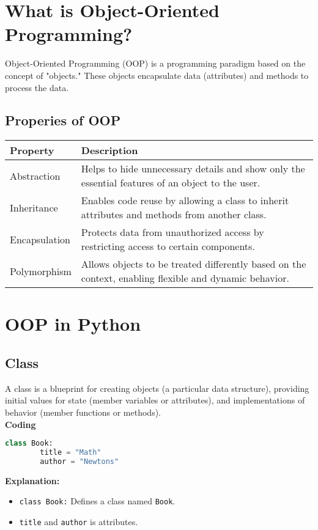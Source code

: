 \section{What is Object-Oriented Programming?}

Object-Oriented Programming (OOP) is a programming paradigm based on the concept of "objects." These objects encapsulate data (attributes) and methods to process the data.


\subsection{Properies of OOP}
\begin{table}[!h]
	\centering
	\begin{tabular}{|p{3cm}|p{9cm}|}
		\hline
		\textbf{Property} & \textbf{Description} \\ \hline
		Abstraction & Helps to hide unnecessary details and show only the essential features of an object to the user. \\ \hline
		Inheritance & Enables code reuse by allowing a class to inherit attributes and methods from another class. \\ \hline
		Encapsulation & Protects data from unauthorized access by restricting access to certain components. \\ \hline
		Polymorphism & Allows objects to be treated differently based on the context, enabling flexible and dynamic behavior. \\ \hline
	\end{tabular}
\end{table}

\section{OOP in Python}
\subsection{Class}
A class is a blueprint for creating objects (a particular data structure), providing initial values for state (member variables or attributes), and implementations of behavior (member functions or methods).\\
\textbf{Coding}
\begin{lstlisting}[language=python, caption={Define Book class}]
	class Book:
		title = "Math"
		author = "Newtons"
\end{lstlisting}

\textbf{Explanation:}
\begin{itemize}
	\item \texttt{class Book:} Defines a class named \texttt{Book}.
	\item \texttt{title} and \texttt{author} is attributes. 
\end{itemize}


